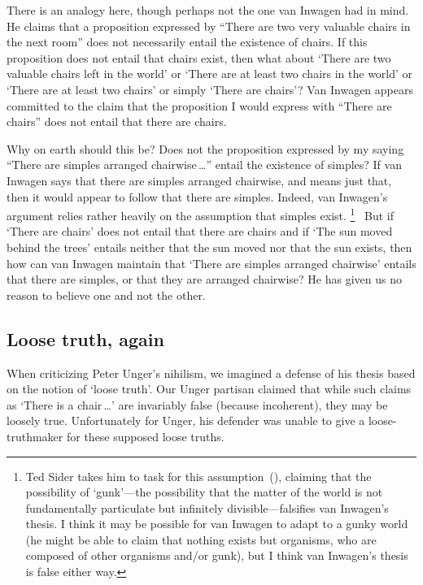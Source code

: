 \documentclass[11pt]{article}
\begin{document}
\begin{spacing}{1.5}
There is an analogy here, though perhaps not the one van Inwagen had in mind.  He claims that a proposition expressed by ``There are two very valuable chairs in the next room'' does not necessarily entail the existence of chairs.  If this proposition does not entail that chairs exist, then what about `There are two valuable chairs left in the world' or `There are at least two chairs in the world' or `There are at least two chairs' or simply `There are chairs'? Van Inwagen appears committed to the claim that the proposition I would express with ``There are chairs'' does not entail that there are chairs.

Why on earth should this be? Does not the proposition expressed by my saying ``There are simples arranged chairwise\,\ldots '' entail the existence of simples? If van Inwagen says that there are simples arranged chairwise, and means just that, then it would appear to follow that there are simples.  Indeed, van Inwagen's argument relies rather heavily on the assumption that simples exist.%
%
\footnote{Ted Sider takes him to task for this assumption~(\citeyear{sider1993}), claiming that the possibility of `gunk'---the possibility that the matter of the world is not fundamentally particulate but infinitely divisible---falsifies van Inwagen's thesis.  I think it may be possible for van Inwagen to adapt to a gunky world (he might be able to claim that nothing exists but organisms, who are composed of other organisms and/or gunk), but I think van Inwagen's thesis is false either way.}
%
\ But if `There are chairs' does not entail that there are chairs and if `The sun moved behind the trees' entails neither that the sun moved nor that the sun exists, then how can van Inwagen maintain that `There are simples arranged chairwise' entails that there are simples, or that they are arranged chairwise? He has given us no reason to believe one and not the other.

\subsection{Loose truth, again}
\label{loose-v}
When criticizing Peter Unger's nihilism, we imagined a defense of his thesis based on the notion of `loose truth'.  Our Unger partisan claimed that while such claims as `There is a chair\,\ldots ' are invariably false (because incoherent), they may be loosely true.  Unfortunately for Unger, his defender was unable to give a loose-truthmaker for these supposed loose truths.


\end{spacing}
\end{document}
